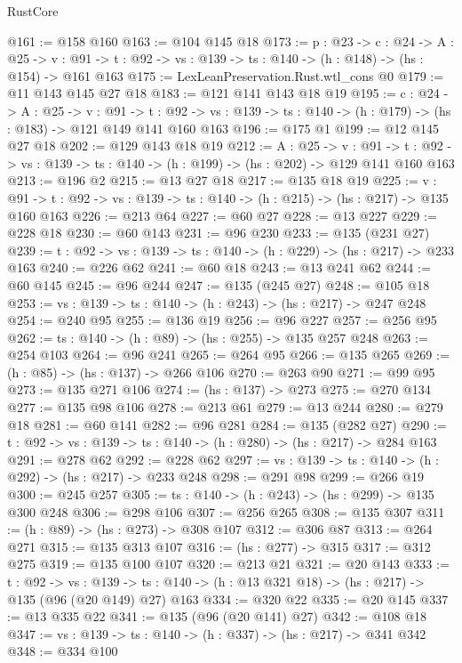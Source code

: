 \begin{lexlean}{RustCore}
\begin{coremodule}
@161 := @158 @160
@163 := @104 @145 @18
@173 := {p : @23} ->
  {c : @24} ->
  {A : @25} ->
  {v : @91} -> {t : @92} -> {vs : @139} -> {ts : @140} -> (h : @148) -> (hs : @154) -> @161 @163
@175 := LexLeanPreservation.Rust.wtl_cons @0
@179 := @11 @143 @145 @27 @18
@183 := @121 @141 @143 @18 @19
@195 := {c : @24} ->
  {A : @25} ->
  {v : @91} ->
  {t : @92} -> {vs : @139} -> {ts : @140} -> (h : @179) -> (hs : @183) -> @121 @149 @141 @160 @163
@196 := @175 @1
@199 := @12 @145 @27 @18
@202 := @129 @143 @18 @19
@212 := {A : @25} ->
  {v : @91} ->
  {t : @92} -> {vs : @139} -> {ts : @140} -> (h : @199) -> (hs : @202) -> @129 @141 @160 @163
@213 := @196 @2
@215 := @13 @27 @18
@217 := @135 @18 @19
@225 := {v : @91} ->
  {t : @92} -> {vs : @139} -> {ts : @140} -> (h : @215) -> (hs : @217) -> @135 @160 @163
@226 := @213 @64
@227 := @60 @27
@228 := @13 @227
@229 := @228 @18
@230 := @60 @143
@231 := @96 @230
@233 := @135 (@231 @27)
@239 := {t : @92} -> {vs : @139} -> {ts : @140} -> (h : @229) -> (hs : @217) -> @233 @163
@240 := @226 @62
@241 := @60 @18
@243 := @13 @241 @62
@244 := @60 @145
@245 := @96 @244
@247 := @135 (@245 @27)
@248 := @105 @18
@253 := {vs : @139} -> {ts : @140} -> (h : @243) -> (hs : @217) -> @247 @248
@254 := @240 @95
@255 := @136 @19
@256 := @96 @227
@257 := @256 @95
@262 := {ts : @140} -> (h : @89) -> (hs : @255) -> @135 @257 @248
@263 := @254 @103
@264 := @96 @241
@265 := @264 @95
@266 := @135 @265
@269 := (h : @85) -> (hs : @137) -> @266 @106
@270 := @263 @90
@271 := @99 @95
@273 := @135 @271 @106
@274 := (hs : @137) -> @273
@275 := @270 @134
@277 := @135 @98 @106
@278 := @213 @61
@279 := @13 @244
@280 := @279 @18
@281 := @60 @141
@282 := @96 @281
@284 := @135 (@282 @27)
@290 := {t : @92} -> {vs : @139} -> {ts : @140} -> (h : @280) -> (hs : @217) -> @284 @163
@291 := @278 @62
@292 := @228 @62
@297 := {vs : @139} -> {ts : @140} -> (h : @292) -> (hs : @217) -> @233 @248
@298 := @291 @98
@299 := @266 @19
@300 := @245 @257
@305 := {ts : @140} -> (h : @243) -> (hs : @299) -> @135 @300 @248
@306 := @298 @106
@307 := @256 @265
@308 := @135 @307
@311 := (h : @89) -> (hs : @273) -> @308 @107
@312 := @306 @87
@313 := @264 @271
@315 := @135 @313 @107
@316 := (hs : @277) -> @315
@317 := @312 @275
@319 := @135 @100 @107
@320 := @213 @21
@321 := @20 @143
@333 := {t : @92} ->
  {vs : @139} -> {ts : @140} -> (h : @13 @321 @18) -> (hs : @217) -> @135 (@96 (@20 @149) @27) @163
@334 := @320 @22
@335 := @20 @145
@337 := @13 @335 @22
@341 := @135 (@96 (@20 @141) @27)
@342 := @108 @18
@347 := {vs : @139} -> {ts : @140} -> (h : @337) -> (hs : @217) -> @341 @342
@348 := @334 @100

\end{coremodule}
\end{lexlean}

